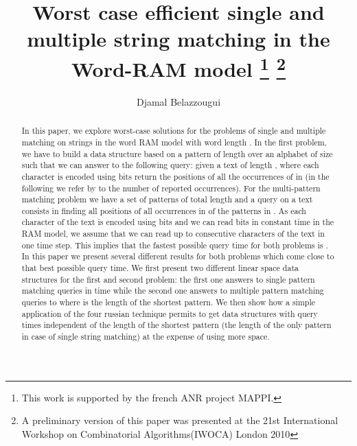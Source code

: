 \documentclass{article}
\newcommand{\?}{\mskip1.5mu}
\begin{document}
 
\title{Worst case efficient single and multiple string matching in the Word-RAM model
\thanks{This work is supported by the french ANR project MAPPI.}
\thanks{A preliminary version of this paper was presented at the 21st International Workshop on Combinatorial Algorithms(IWOCA)  London 2010}
}   

\author{Djamal Belazzougui}

\maketitle
\begin{abstract}


In this paper, we explore worst-case solutions for the problems of single and multiple matching on strings in the word RAM model with word length . 
In the first problem, we have to build a data structure based on a pattern  of length  over an alphabet of size  such that we can answer to the following query: given a text  of length , where each character is encoded using  bits return the positions of all the occurrences of  in  (in the following we refer by  to the number of reported occurrences). For the multi-pattern matching problem we have a set  of  patterns of total length  and a query on a text  consists in finding all positions of all occurrences in  of the patterns in . As each character of the text is encoded using  bits and we can read  bits in constant time in the RAM model, we assume that we can read up to  consecutive characters of the text in one time step. This implies that the fastest possible query time for both problems is . In this paper we present several different results for both problems which come close to that best possible query time. 
We first present two different linear space data structures for the first and second problem: the first one answers to single pattern matching queries in time  while the second one answers to multiple pattern matching queries to  where  is the length of the shortest pattern. We then show how a simple application of the four russian technique permits to get data structures with query times independent of the length of the shortest pattern (the length of the only pattern in case of single string matching) at the expense of using more space.



\end{abstract}
\end{document}
